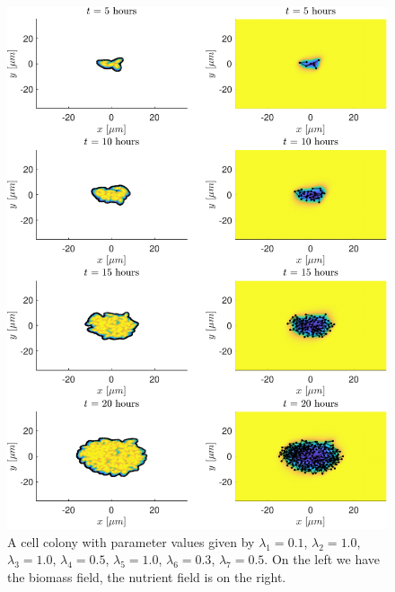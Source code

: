 \newpage

\begin{figure}[!htb] %
    \centering
    \includegraphics[width= 1\textwidth]{
        chapter2/figures/t_all_L1_0o10_L2_1o00_L3_1o00_L4_0o50_L5_1o00_L6_0o30_L7_0o50.pdf}
    \caption{A cell colony with parameter values given by
             $\lambda_1 = 0.1$,  
             $\lambda_2 = 1.0$, 
             $\lambda_3 = 1.0$, 
             $\lambda_4 = 0.5$, 
             $\lambda_5 = 1.0$, 
             $\lambda_6 = 0.3$, 
             $\lambda_7 = 0.5$. 
             On the left we have the biomass field, the nutrient field is on the right.}
    \label{fig: sdsd}
\end{figure}


\newpage



